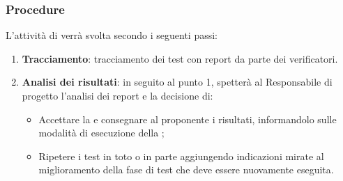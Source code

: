 \subsubsection{Procedure}
L’attività di  verrà svolta secondo i seguenti passi:
\begin{enumerate} 
	\item \textbf{Tracciamento}: tracciamento dei test con report da parte dei verificatori.
	\item \textbf{Analisi dei risultati}: in seguito al punto 1, spetterà al Responsabile di progetto l’analisi dei report e la decisione di:
	\begin{itemize}
		\item Accettare la  e consegnare al proponente i risultati, informandolo sulle modalità di esecuzione della ;
		\item Ripetere i test in toto o in parte aggiungendo indicazioni mirate al miglioramento della fase di test che deve essere nuovamente eseguita.
	\end{itemize}
\end{enumerate}
